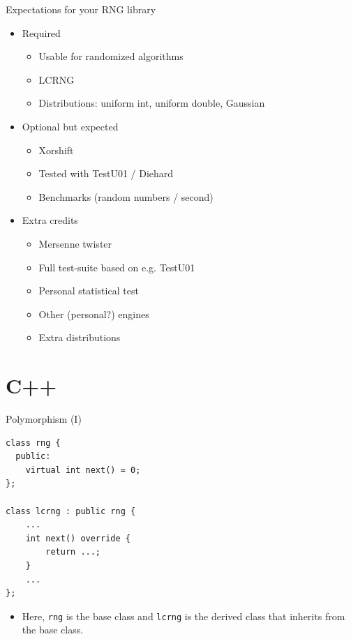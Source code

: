 \documentclass[10pt]{beamer}
\begin{document}
\begin{frame}[label={sec:orgef1999a}]{Expectations for your RNG library}
\begin{itemize}
\item Required
\begin{itemize}
\item Usable for randomized algorithms
\item LCRNG
\item Distributions: uniform int, uniform double, Gaussian
\end{itemize}
\item Optional but expected
\begin{itemize}
\item Xorshift
\item Tested with TestU01 / Diehard
\item Benchmarks (random numbers / second)
\end{itemize}
\item Extra credits
\begin{itemize}
\item Mersenne twister
\item Full test-suite based on e.g. TestU01
\item Personal statistical test
\item Other (personal?) engines
\item Extra distributions
\end{itemize}
\end{itemize}
\end{frame}

\section{C++}
\label{sec:orgdf64a5f}
\begin{frame}[fragile,label={sec:org1cf3c21}]{Polymorphism (I)}
 \begin{verbatim}
class rng {
  public:
    virtual int next() = 0;
};

class lcrng : public rng {
    ...
    int next() override {
        return ...;
    }
    ...
};
\end{verbatim}

\begin{itemize}
\item Here, \texttt{rng} is the \alert{base} class and \texttt{lcrng} is the \alert{derived} class that
\alert{inherits} from the base class.
\end{itemize}
\end{frame}
\end{document}
